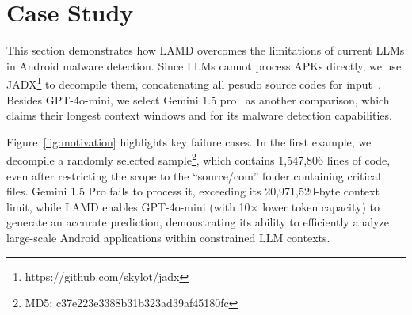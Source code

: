 \section{Case Study}
This section demonstrates how LAMD overcomes the limitations of current LLMs in Android malware detection. Since LLMs cannot process APKs directly, we use JADX\footnote{https://github.com/skylot/jadx} to decompile them, concatenating all pesudo source codes for input~\cite{llm4codeanalysis}. Besides GPT-4o-mini, we select Gemini 1.5 pro~\cite{gemini1.5} as another comparison, which claims their longest context windows and for its malware detection capabilities.


Figure~\ref{fig:motivation} highlights key failure cases. In the first example, we decompile a randomly selected sample\footnote{MD5: c37e223e3388b31b323ad39af45180fc}, which contains 1,547,806 lines of code, even after restricting the scope to the ``source/com'' folder containing critical files. Gemini 1.5 Pro fails to process it, exceeding its 20,971,520-byte context limit, while LAMD enables GPT-4o-mini (with 10× lower token capacity) to generate an accurate prediction, demonstrating its ability to efficiently analyze large-scale Android applications within constrained LLM contexts.


